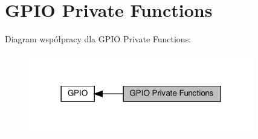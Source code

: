 \hypertarget{group___g_p_i_o___private___functions}{}\section{G\+P\+IO Private Functions}
\label{group___g_p_i_o___private___functions}
Diagram współpracy dla G\+P\+IO Private Functions\+:\nopagebreak
\begin{figure}[H]
\begin{center}
\leavevmode
\includegraphics[width=278pt]{group___g_p_i_o___private___functions}
\end{center}
\end{figure}
